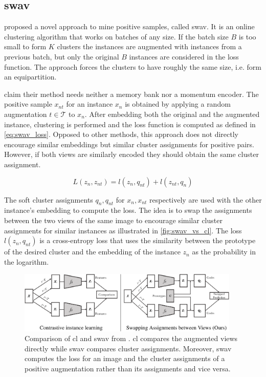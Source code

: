 \subsection{\acl{swav}}\label{subsec:SwAV}

\citet{swav_2020} proposed a novel approach to mine positive samples, called \ac{swav}.
It is an online clustering algorithm that works on batches of any size.
If the batch size $B$ is too small to form $K$ clusters the instances are augmented 
with instances from a previous batch, 
but only the original $B$ instances are considered in the loss function.
The approach forces the clusters to have roughly the same size, i.e. form an equipartition.

\citeauthor{swav_2020} claim their method needs neither a memory bank nor a momentum encoder.
The positive sample $x_{nt}$ for an instance $x_n$ is obtained by applying a 
random augmentation $t \in \mathcal{T}$ to $x_n$.
After embedding both the original and the augmented instance, clustering is performed and 
the loss function is computed as defined in \eqref{eq:swav_loss}.
Opposed to other methods, this approach does not directly encourage similar embeddings but similar 
cluster assignments for positive pairs.
However, if both views are similarly encoded they should obtain the same cluster assignment.

\begin{equation}
    L(z_n, z_{nt}) = l(z_n, q_{nt}) + l(z_{nt}, q_n)
    \label{eq:swav_loss}
\end{equation}

The soft cluster assignments $q_n, q_{nt}$ for $x_n, x_{nt}$ respectively 
are used with the other instance's embedding to compute the loss.
The idea is to swap the assignments between the two views of the same image to encourage 
similar cluster assignments for similar instances as illustrated in \autoref{fig:swav_vs_cl}.
The loss $l(z_n, q_{nt})$ is a cross-entropy loss that uses the similarity between the prototype 
of the desired cluster and the embedding of the instance $z_n$ as the probability in the logarithm.

\begin{figure}[!htb] %
    \centering
    \includegraphics[width=300pt]{images/SwAV_vs_CL.png}
    \caption{Comparison of \ac{cl} and \ac{swav} from \citet{swav_2020}.
    \ac{cl} compares the augmented views directly while 
    \ac{swav} compares cluster assignments.
    Moreover, \ac{swav} computes the loss for an image and the cluster assignments of a positive augmentation 
    rather than its assignments and vice versa.}
    \label{fig:swav_vs_cl}
\end{figure}

